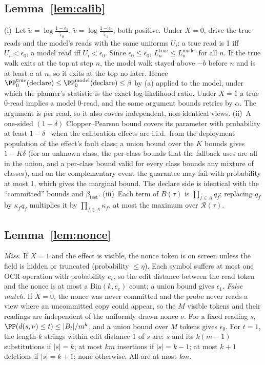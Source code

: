 \subsection{Lemma~\ref{lem:calib}}
(i)~Let $\tilde u=\log\frac{1-\tilde\epsilon_1}{\tilde\epsilon_0}$, $\tilde v=\log\frac{1-\tilde\epsilon_0}{\tilde\epsilon_1}$, both positive. Under $X{=}0$, drive the true reads and the model's
reads with the same uniforms $U_i$: a true read is 1 iff $U_i<\epsilon_0$, a model read iff $U_i<\tilde\epsilon_0$. Since $\epsilon_0\le\tilde\epsilon_0$, $L^{\mathrm{true}}_n\le L^{\mathrm{model}}_n$
for all $n$. If the true walk exits at the top at step $n$, the model walk stayed above $-b$ before $n$ and is at least $a$ at $n$, so it exits at the top no later. Hence
$\PP^{\mathrm{true}}_0(\text{declare})\le\PP^{\mathrm{model}}_0(\text{declare})\le\beta$ by (a) applied to the model, under which the planner's statistic is the exact log-likelihood ratio.
Under $X{=}1$ a true 0-read implies a model 0-read, and the same argument bounds retries by $\alpha$. The argument is per read, so it also covers independent, non-identical views.
(ii)~A one-sided $(1-\delta)$ Clopper--Pearson bound covers its parameter with probability at least $1-\delta$~\cite{clopper1934use} when the calibration effects are i.i.d.\ from the deployment
population of the effect's fault class; a union bound over the $K$ bounds gives $1-K\delta$ (for an unknown class, the per-class bounds that the fallback uses are all in the union, and
a per-class bound valid for every class bounds any mixture of classes), and on the complementary event the guarantee may fail with probability at most 1, which gives the marginal bound. The
declare side is identical with the ``committed'' bounds and $\beta_{\mathrm{test}}$.
(iii)~Each term of $B(\tau)$ is $\prod_{f\in A}q_f$; replacing $q_f$ by $\kappa_fq_f$ multiplies it by $\prod_{f\in A}\kappa_f$, at most the maximum over $\mathcal R(\tau)$.

\subsection{Lemma~\ref{lem:nonce}}
\emph{Miss.} If $X{=}1$ and the effect is visible, the nonce token is on screen unless the field is hidden or truncated (probability $\le\eta$). Each symbol suffers at most one OCR
operation with probability $e_c$, so the edit distance between the read token and the nonce is at most a $\mathrm{Bin}(k,e_c)$ count; a union bound gives $\epsilon_1$.
\emph{False match.} If $X{=}0$, the nonce was never committed and the probe never reads a view where an uncommitted copy could appear, so the $M$ visible tokens and their readings are
independent of the uniformly drawn nonce $\nu$. For a fixed reading $s$, $\PP(d(s,\nu)\le t)\le|B_t|/m^k$, and a union bound over $M$ tokens gives $\epsilon_0$. For $t{=}1$, the
length-$k$ strings within edit distance 1 of $s$ are: $s$ and its $k(m-1)$ substitutions if $|s|=k$; at most $km$ insertions if $|s|=k-1$; at most $k+1$ deletions if $|s|=k+1$;
none otherwise. All are at most $km$.

